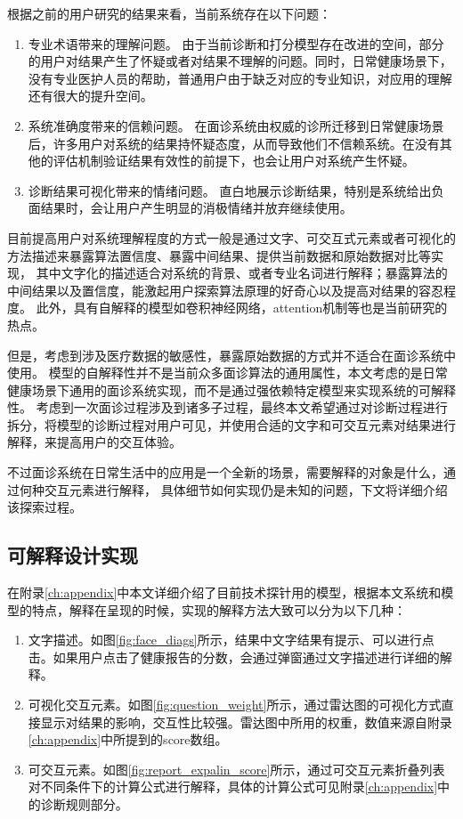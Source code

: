 根据之前的用户研究的结果来看，当前系统存在以下问题：
\begin{enumerate}
    \item 专业术语带来的理解问题。
    由于当前诊断和打分模型存在改进的空间，部分的用户对结果产生了怀疑或者对结果不理解的问题。同时，日常健康场景下，没有专业医护人员的帮助，普通用户由于缺乏对应的专业知识，对应用的理解还有很大的提升空间。
    \item 系统准确度带来的信赖问题。
    在面诊系统由权威的诊所迁移到日常健康场景后，许多用户对系统的结果持怀疑态度，从而导致他们不信赖系统。在没有其他的评估机制验证结果有效性的前提下，也会让用户对系统产生怀疑。
    \item 诊断结果可视化带来的情绪问题。
    直白地展示诊断结果，特别是系统给出负面结果时，会让用户产生明显的消极情绪并放弃继续使用。
\end{enumerate}


目前提高用户对系统理解程度的方式一般是通过文字、可交互式元素或者可视化的方法描述来暴露算法置信度、暴露中间结果、提供当前数据和原始数据对比等实现\cite{wang2019designing, kocielnik2019will}，
其中文字化的描述适合对系统的背景、或者专业名词进行解释；暴露算法的中间结果以及置信度，能激起用户探索算法原理的好奇心以及提高对结果的容忍程度。
此外，具有自解释的模型如卷积神经网络，attention机制等也是当前研究的热点。

但是，考虑到涉及医疗数据的敏感性，暴露原始数据的方式并不适合在面诊系统中使用。
模型的自解释性并不是当前众多面诊算法的通用属性，本文考虑的是日常健康场景下通用的面诊系统实现，而不是通过强依赖特定模型来实现系统的可解释性。
考虑到一次面诊过程涉及到诸多子过程，最终本文希望通过对诊断过程进行拆分，将模型的诊断过程对用户可见，并使用合适的文字和可交互元素对结果进行解释，来提高用户的交互体验。


不过面诊系统在日常生活中的应用是一个全新的场景，需要解释的对象是什么，通过何种交互元素进行解释，
具体细节如何实现仍是未知的问题，下文将详细介绍该探索过程。


\subsection{可解释设计实现}

在附录\ref{ch:appendix}中本文详细介绍了目前技术探针用的模型，根据本文系统和模型的特点，解释在呈现的时候，实现的解释方法大致可以分为以下几种：
\begin{enumerate}
    \item 文字描述。如图\ref{fig:face_diags}所示，结果中文字结果有提示、可以进行点击。如果用户点击了健康报告的分数，会通过弹窗通过文字描述进行详细的解释。

    \item 可视化交互元素。如图\ref{fig:question_weight}所示，通过雷达图的可视化方式直接显示对结果的影响，交互性比较强。雷达图中所用的权重，数值来源自附录\ref{ch:appendix}中所提到的score数组。
    
    \item 可交互元素。如图\ref{fig:report_expalin_score}所示，通过可交互元素折叠列表对不同条件下的计算公式进行解释，具体的计算公式可见附录\ref{ch:appendix}中的诊断规则部分。
\end{enumerate}

